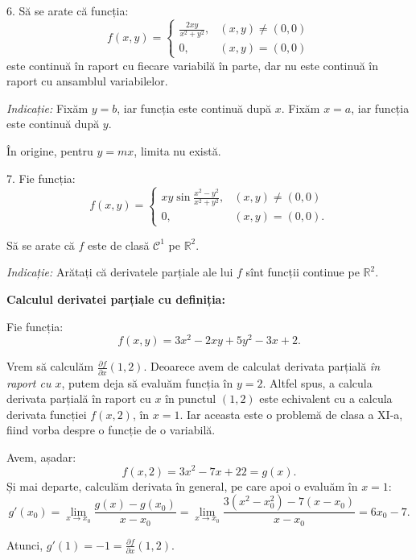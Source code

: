 \documentclass[11pt,a4paper]{article}
\newcommand\kal{\mathcal}
\newcommand\ds{\displaystyle}
\newcommand\RR{\mathbb{R}}
\theoremstyle{dotless}
\theoremstyle{dotlessdr}
\begin{document}
\vspace{1cm}

6. Să se arate că funcția:
\[
  f(x, y) =
  \begin{cases}
    \frac{2xy}{x^2 + y^2}, & (x, y) \neq (0, 0) \\
    0, & (x, y) = (0, 0)
  \end{cases}
\]
este continuă în raport cu fiecare variabilă în parte, dar nu este continuă
în raport cu ansamblul variabilelor.

\emph{Indicație:} Fixăm $y = b$, iar funcția este continuă după $x$. Fixăm
$x = a$, iar funcția este continuă după $y$.

În origine, pentru $y = mx$, limita nu există.

\vspace{1cm}

7. Fie funcția:
\[
  f(x, y) =
  \begin{cases}
    xy \sin \frac{x^2 - y^2}{x^2 + y^2}, & (x, y) \neq (0, 0) \\
    0, & (x, y) = (0, 0).
  \end{cases}
\]

Să se arate că $f$ este de clasă $\kal{C}^1$ pe $\RR^2$.

\emph{Indicație:} Arătați că derivatele parțiale ale lui $f$ sînt funcții
continue pe $\RR^2$.


\newpage


{\color{red}
  \textbf{Calculul derivatei parțiale cu definiția:}

  Fie funcția:
  \[
    f(x, y) = 3x^2 - 2xy + 5y^2 - 3x + 2.
  \]

  Vrem să calculăm $\frac{\partial f}{\partial x}(1, 2)$. Deoarece avem de calculat
  derivata parțială \emph{în raport cu $x$}, putem deja să evaluăm funcția în $y = 2$.
  Altfel spus, a calcula derivata parțială în raport cu $x$ în punctul $(1, 2)$ este
  echivalent cu a calcula derivata funcției $f(x, 2)$, în $x = 1$. Iar aceasta este
  o problemă de clasa a XI-a, fiind vorba despre o funcție de o variabilă.

  Avem, așadar:
  \[
    f(x, 2) = 3x^2 - 7x + 22 = g(x).
  \]
  Și mai departe, calculăm derivata în general, pe care apoi o evaluăm în $x = 1$:
  \[
    g'(x_0) = \ds\lim_{x \to x_0} \frac{g(x) - g(x_0)}{x - x_0} = %
    \ds\lim_{x \to x_0} \frac{3(x^2 - x_0^2) - 7(x - x_0)}{x - x_0} = 6x_0 - 7.
  \]

  Atunci, $g'(1) = -1 = \frac{\partial f}{\partial x}(1, 2)$.
}
\end{document}
